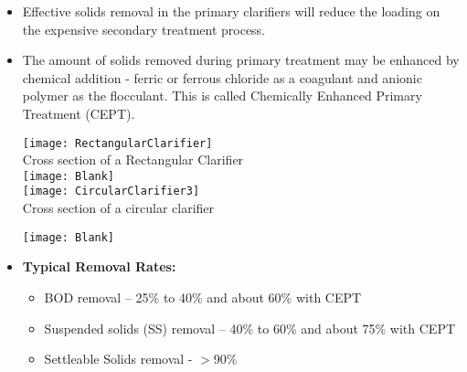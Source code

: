 \documentclass{article}
\begin{document}
\begin{itemize}
		\item Effective solids removal in the primary clarifiers will 			reduce the loading on the expensive secondary treatment 				process.
		\item The amount of solids removed during primary treatment 			may be enhanced by chemical addition - ferric or ferrous 				chloride as a coagulant and anionic polymer as the flocculant.  		This is called Chemically Enhanced Primary Treatment (CEPT).
		\begin{center}
				\texttt{[image: RectangularClarifier]}\\
				Cross section of a Rectangular Clarifier\\
				\texttt{[image: Blank]}\\
				\texttt{[image: CircularClarifier3]}\\
				Cross section of a circular clarifier\\
			\end{center}
				\texttt{[image: Blank]}\\
\item \textbf{Typical Removal Rates:}\\
\begin{itemize}
\item \hspace{10mm} BOD removal – 25\% to 40\% and about 60\% with CEPT
\item \hspace{10mm} Suspended solids (SS) removal – 40\% to 60\% and about 75\% with CEPT
\item \hspace{10mm} Settleable Solids removal - $>$90\%
\end{itemize}
\end{itemize}

\newpage
\end{document}
